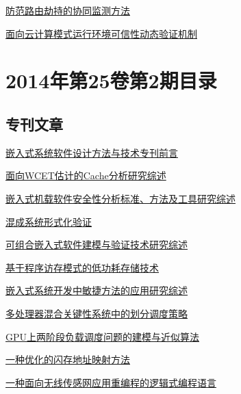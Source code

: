 \documentclass[a4paper]{article}
\begin{document}
\href{http://www.jos.org.cn/ch/reader/download_pdf.aspx?file_no=4407&year_id=2014&quarter_id=3&falg=1}{防范路由劫持的协同监测方法}

\href{http://www.jos.org.cn/ch/reader/download_pdf.aspx?file_no=4447&year_id=2014&quarter_id=3&falg=1}{面向云计算模式运行环境可信性动态验证机制}


\section{\textbf{2014年第25卷第2期目录}}
\subsection{专刊文章}
\href{http://www.jos.org.cn/ch/reader/download_pdf.aspx?file_no=4543&year_id=2014&quarter_id=2&falg=1}{嵌入式系统软件设计方法与技术专刊前言}

\href{http://www.jos.org.cn/ch/reader/download_pdf.aspx?file_no=4529&year_id=2014&quarter_id=2&falg=1}{面向WCET估计的Cache分析研究综述}

\href{http://www.jos.org.cn/ch/reader/download_pdf.aspx?file_no=4530&year_id=2014&quarter_id=2&falg=1}{嵌入式机载软件安全性分析标准、方法及工具研究综述}

\href{http://www.jos.org.cn/ch/reader/download_pdf.aspx?file_no=4535&year_id=2014&quarter_id=2&falg=1}{混成系统形式化验证}

\href{http://www.jos.org.cn/ch/reader/download_pdf.aspx?file_no=4533&year_id=2014&quarter_id=2&falg=1}{可组合嵌入式软件建模与验证技术研究综述}

\href{http://www.jos.org.cn/ch/reader/download_pdf.aspx?file_no=4537&year_id=2014&quarter_id=2&falg=1}{基于程序访存模式的低功耗存储技术}

\href{http://www.jos.org.cn/ch/reader/download_pdf.aspx?file_no=4539&year_id=2014&quarter_id=2&falg=1}{嵌入式系统开发中敏捷方法的应用研究综述}

\href{http://www.jos.org.cn/ch/reader/download_pdf.aspx?file_no=4534&year_id=2014&quarter_id=2&falg=1}{多处理器混合关键性系统中的划分调度策略}

\href{http://www.jos.org.cn/ch/reader/download_pdf.aspx?file_no=4527&year_id=2014&quarter_id=2&falg=1}{GPU上两阶段负载调度问题的建模与近似算法}

\href{http://www.jos.org.cn/ch/reader/download_pdf.aspx?file_no=4528&year_id=2014&quarter_id=2&falg=1}{一种优化的闪存地址映射方法}

\href{http://www.jos.org.cn/ch/reader/download_pdf.aspx?file_no=4531&year_id=2014&quarter_id=2&falg=1}{一种面向无线传感网应用重编程的逻辑式编程语言}
\end{document}
